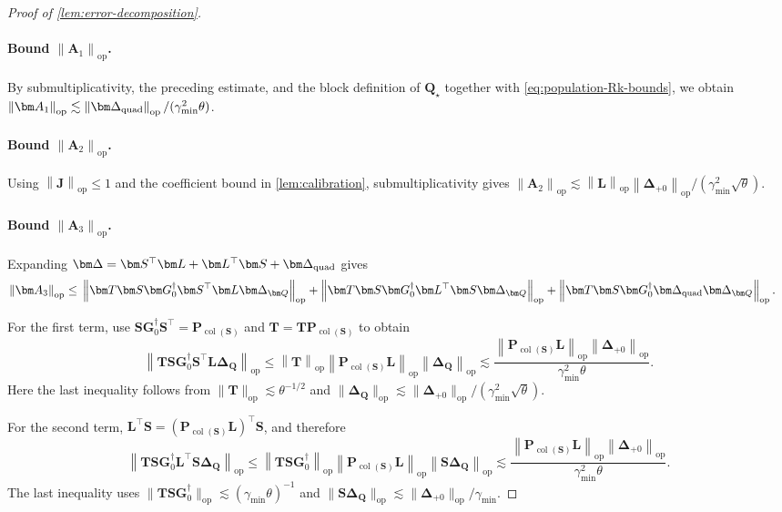\documentclass[11pt]{article}
\newcommand{\trans}{\top}
\DeclareMathOperator{\col}{col}
\newcommand{\opn}[1]{\left\lVert #1\right\rVert_{\mathrm{op}}}
\newcommand{\gmin}{\gamma_{\min}}
\begin{document}
\begin{proof}[Proof of \cref{lem:error-decomposition}]
\paragraph{Bound $\opn{\bm A_1}$.}
By submultiplicativity, the preceding estimate, and the block definition of
$\bm Q_\star$ together with \cref{eq:population-Rk-bounds}, we obtain
$\opn{\bm A_1}
\lesssim\opn{\bm\Delta_{\rm quad}}/(\gmin^2\theta)$.

\paragraph{Bound $\opn{\bm A_2}$.}
Using $\opn{\bm J}\le1$ and the coefficient bound in
\cref{lem:calibration}, submultiplicativity gives
$\opn{\bm A_2}
\lesssim
\opn{\bm L}\opn{\bm\Delta_{+0}}/
(\gmin^2\sqrt\theta)$.



\paragraph{Bound $\opn{\bm A_3}$.} Expanding
$\bm\Delta
=\bm S^\trans\bm L+\bm L^\trans\bm S+\bm\Delta_{\rm quad}$ gives
\begin{align*}
  \opn{\bm A_3}
  \le{}&
  \opn{
    \bm T\bm S\bm G_0^\dagger
    \bm S^\trans\bm L\bm\Delta_{\bm Q}
  }
  +
  \opn{
    \bm T\bm S\bm G_0^\dagger
    \bm L^\trans\bm S\bm\Delta_{\bm Q}
  } +
  \opn{
    \bm T\bm S\bm G_0^\dagger
    \bm\Delta_{\rm quad}\bm\Delta_{\bm Q}
  }.
\end{align*}

For the first term, use
$\bm S\bm G_0^\dagger\bm S^\trans
=\bm P_{\col(\bm S)}$ and
$\bm T=\bm T\bm P_{\col(\bm S)}$ to obtain
\[
  \opn{
    \bm T\bm S\bm G_0^\dagger
    \bm S^\trans\bm L\bm\Delta_{\bm Q}
  }
  \le
  \opn{\bm T}
  \opn{\bm P_{\col(\bm S)}\bm L}
  \opn{\bm\Delta_{\bm Q}}
  \lesssim
  \frac{
    \opn{\bm P_{\col(\bm S)}\bm L}
    \opn{\bm\Delta_{+0}}
  }{
    \gmin^2\theta
  }.
\]
Here the last inequality follows from
$\|\bm T\|_{\mathrm{op}}\lesssim\theta^{-1/2}$ and
$\|\bm\Delta_{\bm Q}\|_{\mathrm{op}}
\lesssim
\|\bm\Delta_{+0}\|_{\mathrm{op}}/
(\gmin^2\sqrt\theta)$.

For the second term,
$\bm L^\trans\bm S
=(\bm P_{\col(\bm S)}\bm L)^\trans\bm S$, and therefore
\[
  \opn{
    \bm T\bm S\bm G_0^\dagger
    \bm L^\trans\bm S\bm\Delta_{\bm Q}
  }
  \le
  \opn{\bm T\bm S\bm G_0^\dagger}
  \opn{\bm P_{\col(\bm S)}\bm L}
  \opn{\bm S\bm\Delta_{\bm Q}}
  \lesssim
  \frac{
    \opn{\bm P_{\col(\bm S)}\bm L}
    \opn{\bm\Delta_{+0}}
  }{
    \gmin^2\theta
  }.
\]
The last inequality uses
$\|\bm T\bm S\bm G_0^\dagger\|_{\mathrm{op}}
\lesssim(\gmin\theta)^{-1}$ and
$\|\bm S\bm\Delta_{\bm Q}\|_{\mathrm{op}}
\lesssim\|\bm\Delta_{+0}\|_{\mathrm{op}}/\gmin$.


\end{proof}
\end{document}
